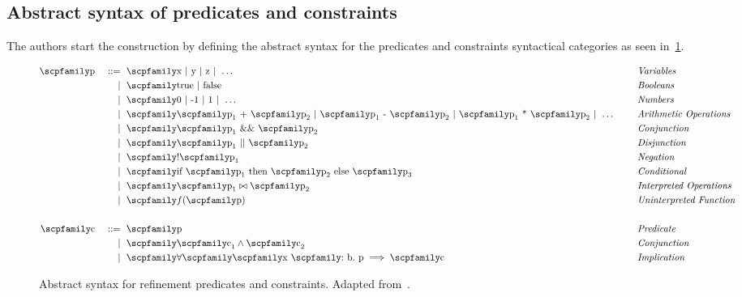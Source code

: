 \documentclass[
  oneside,
  english,
  coorientadorbanca,
  noabntexcite
]{ufsc-thesis-rn46-2019}
\def\bnfdef{::=}
\newcommand{\codett}[1]{\text{\scpfamily#1}}
\newcommand{\code}[1]{\text{\scpfamily\setlength\spaceskip{0.35em}#1}}
\newcommand{\bnfmore}[1]{            & \ & \mid{}    & \ \code{#1}}
\newcommand{\astprod}[2]{\code{#1} & \ & \bnfdef{} & \ \code{#2}}
\newcommand{\astmore}[1]{\bnfmore{#1}}
\newcommand{\typer}[2]{\code{#1 \codett{:} #2}}
\begin{document}
\subsection{Abstract syntax of predicates and constraints}\label{ch:refinement_types:subsec:predicates_ast}

The authors start the construction by defining the abstract syntax for the predicates and constraints syntactical categories as seen in~\cref{fig:refinement_predicates}.
\begin{figure}[ht]
  \begin{minipage}{\textwidth}
    \begin{alignat*}{4}
      \astprod{p}{x $\mid$ y $\mid$ z $\mid\ \dots$} & \quad & \textit{Variables}              \\
      \astmore{true $\mid$ false}                    & \quad & \textit{Booleans}               \\
      \astmore{0 $\mid$ -1 $\mid$ 1 $\mid\ \dots$ }  & \quad & \textit{Numbers}                \\
      \astmore{%
        $\code{p}_1$ + $\code{p}_2$
        $\mid$ $\code{p}_1$ - $\code{p}_2$
        $\mid$ $\code{p}_1$ * $\code{p}_2$
        $\mid\ \dots$
      }                                              & \quad & \textit{Arithmetic Operations}  \\
      \astmore{$\code{p}_1$ \&\& $\code{p}_2$}       & \quad & \textit{Conjunction}            \\
      \astmore{$\code{p}_1$ || $\code{p}_2$}         & \quad & \textit{Disjunction}            \\
      \astmore{!$\code{p}_1$}                        & \quad & \textit{Negation}               \\
      \astmore{if $\code{p}_1$ then $\code{p}_2$ else $\code{p}_3$}
                                                     & \quad & \textit{Conditional}            \\
      \astmore{$\code{p}_1\bowtie\code{p}_2$}        & \quad & \textit{Interpreted Operations} \\
      \astmore{$f{(\code{p})}$}                      & \quad & \textit{Uninterpreted Function} \\
      \\
      \astprod{c}{p}                                 & \quad & \textit{Predicate}              \\
      \astmore{$\code{c}_1\land\code{c}_2$}          & \quad & \textit{Conjunction}            \\
      \astmore{$\forall\code{\typer{x}{b}.\ p}\implies\code{c}$ }
                                                     & \quad & \textit{Implication}            \\
    \end{alignat*}
  \end{minipage}
  \caption{
    Abstract syntax for refinement predicates and constraints.
    Adapted from~\cite{jhala2020tutorial}.
  }\label{fig:refinement_predicates}
\end{figure}
\end{document}
